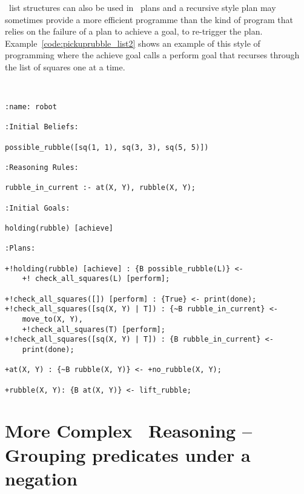 \prolog\ list structures can also be used in \gwendolen\ plans and a recursive style plan may sometimes provide a more efficient programme than the kind of program that relies on the failure of a plan to achieve a goal, to re-trigger the plan.  Example~\ref{code:pickuprubble_list2} shows an example of this style of programming where the achieve goal calls a perform goal that recurses through the list of squares one at a time.
\begin{ourexample}
\label{code:pickuprubble_list2} \quad \\
\begin{lstlisting}[basicstyle=\sffamily,style=easslisting,language=Gwendolen]
:name: robot

:Initial Beliefs:

possible_rubble([sq(1, 1), sq(3, 3), sq(5, 5)])

:Reasoning Rules:

rubble_in_current :- at(X, Y), rubble(X, Y);

:Initial Goals:

holding(rubble) [achieve]

:Plans:

+!holding(rubble) [achieve] : {B possible_rubble(L)} <- 
    +! check_all_squares(L) [perform];

+!check_all_squares([]) [perform] : {True} <- print(done);
+!check_all_squares([sq(X, Y) | T]) : {~B rubble_in_current} <- 
    move_to(X, Y), 
    +!check_all_squares(T) [perform];
+!check_all_squares([sq(X, Y) | T]) : {B rubble_in_current} <- 
    print(done);

+at(X, Y) : {~B rubble(X, Y)} <- +no_rubble(X, Y);

+rubble(X, Y): {B at(X, Y)} <- lift_rubble;
\end{lstlisting}
\end{ourexample}

\section{More Complex \prolog\ Reasoning -- Grouping predicates under a negation}

